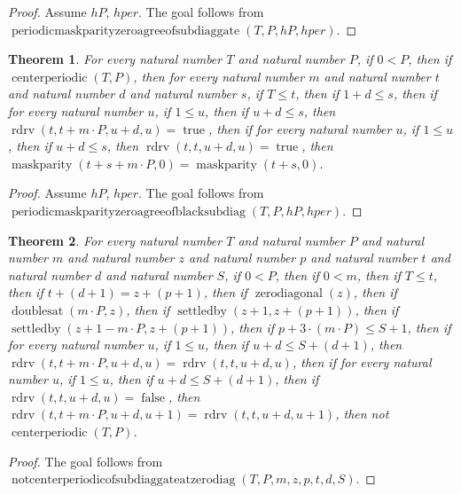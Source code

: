 \documentclass[11pt]{article}
\newtheorem{theorem}{Theorem}[section]
\theoremstyle{definition}
\begin{document}
\begin{proof}
Assume \(hP\), \(hper\).
The goal follows from \(\operatorname{periodicmaskparityzeroagreeofsubdiaggate}(T, P, hP, hper)\).
\end{proof}
\begin{theorem}
\label{ll:paper:periodic-maskparity-zero-agree-of-black-subdiag}
For every natural number \(T\) and natural number \(P\), if \(0 < P\), then if \(\operatorname{centerperiodic}(T, P)\), then for every natural number \(m\) and natural number \(t\) and natural number \(d\) and natural number \(s\), if \(T \le t\), then if \(1 + d \le s\), then if for every natural number \(u\), if \(1 \le u\), then if \(u + d \le s\), then \(\operatorname{rdrv}(t, t + m \cdot P, u + d, u) = \operatorname{true}\), then if for every natural number \(u\), if \(1 \le u\), then if \(u + d \le s\), then \(\operatorname{rdrv}(t, t, u + d, u) = \operatorname{true}\), then \(\operatorname{maskparity}(t + s + m \cdot P, 0) = \operatorname{maskparity}(t + s, 0)\).
\end{theorem}
\begin{proof}
Assume \(hP\), \(hper\).
The goal follows from \(\operatorname{periodicmaskparityzeroagreeofblacksubdiag}(T, P, hP, hper)\).
\end{proof}
\begin{theorem}
\label{ll:paper:not-centerperiodic-of-subdiag-gate-at-zero-diag}
For every natural number \(T\) and natural number \(P\) and natural number \(m\) and natural number \(z\) and natural number \(p\) and natural number \(t\) and natural number \(d\) and natural number \(S\), if \(0 < P\), then if \(0 < m\), then if \(T \le t\), then if \(t + (d + 1) = z + (p + 1)\), then if \(\operatorname{zerodiagonal}(z)\), then if \(\operatorname{doublesat}(m \cdot P, z)\), then if \(\operatorname{settledby}(z + 1, z + (p + 1))\), then if \(\operatorname{settledby}(z + 1 - m \cdot P, z + (p + 1))\), then if \(p + 3 \cdot (m \cdot P) \le S + 1\), then if for every natural number \(u\), if \(1 \le u\), then if \(u + d \le S + (d + 1)\), then \(\operatorname{rdrv}(t, t + m \cdot P, u + d, u) = \operatorname{rdrv}(t, t, u + d, u)\), then if for every natural number \(u\), if \(1 \le u\), then if \(u + d \le S + (d + 1)\), then if \(\operatorname{rdrv}(t, t, u + d, u) = \operatorname{false}\), then \(\operatorname{rdrv}(t, t + m \cdot P, u + d, u + 1) = \operatorname{rdrv}(t, t, u + d, u + 1)\), then not \(\operatorname{centerperiodic}(T, P)\).
\end{theorem}
\begin{proof}
The goal follows from \(\operatorname{notcenterperiodicofsubdiaggateatzerodiag}(T, P, m, z, p, t, d, S)\).
\end{proof}
\end{document}
